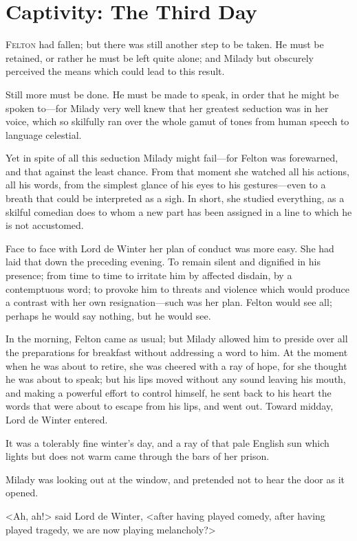 
\chapter{Captivity: The Third Day}

\lettrine{F}{elton} had fallen; but there was still another step to be taken. He must be retained, or rather he must be left quite alone; and Milady but obscurely perceived the means which could lead to this result. 

\zz
Still more must be done. He must be made to speak, in order that he might be spoken to—for Milady very well knew that her greatest seduction was in her voice, which so skilfully ran over the whole gamut of tones from human speech to language celestial. 

Yet in spite of all this seduction Milady might fail—for Felton was forewarned, and that against the least chance. From that moment she watched all his actions, all his words, from the simplest glance of his eyes to his gestures—even to a breath that could be interpreted as a sigh. In short, she studied everything, as a skilful comedian does to whom a new part has been assigned in a line to which he is not accustomed. 

Face to face with Lord de Winter her plan of conduct was more easy. She had laid that down the preceding evening. To remain silent and dignified in his presence; from time to time to irritate him by affected disdain, by a contemptuous word; to provoke him to threats and violence which would produce a contrast with her own resignation—such was her plan. Felton would see all; perhaps he would say nothing, but he would see. 

In the morning, Felton came as usual; but Milady allowed him to preside over all the preparations for breakfast without addressing a word to him. At the moment when he was about to retire, she was cheered with a ray of hope, for she thought he was about to speak; but his lips moved without any sound leaving his mouth, and making a powerful effort to control himself, he sent back to his heart the words that were about to escape from his lips, and went out. Toward midday, Lord de Winter entered. 

It was a tolerably fine winter's day, and a ray of that pale English sun which lights but does not warm came through the bars of her prison. 

Milady was looking out at the window, and pretended not to hear the door as it opened. 

<Ah, ah!> said Lord de Winter, <after having played comedy, after having played tragedy, we are now playing melancholy?> 

